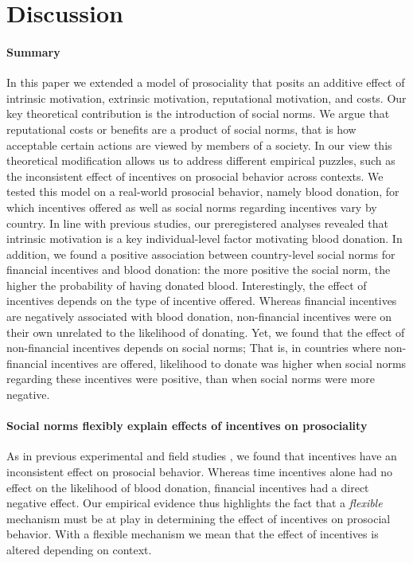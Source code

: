 \documentclass[AER]{AEA}
\begin{document}
\section{Discussion}

\paragraph{Summary}

In this paper we extended a model of prosociality that posits an additive effect of intrinsic motivation, extrinsic motivation, reputational motivation, and costs. Our key theoretical contribution is the introduction of social norms. We argue that reputational costs or benefits are a product of social norms, that is how acceptable certain actions are viewed by members of a society. In our view this theoretical modification allows us to address different empirical puzzles, such as the inconsistent effect of incentives on prosocial behavior across contexts. We tested this model on a real-world prosocial behavior, namely blood donation, for which incentives offered as well as social norms regarding incentives vary by country. In line with previous studies, our preregistered analyses revealed that intrinsic motivation is a key individual-level factor motivating blood donation. In addition, we found a positive association between country-level social norms for financial incentives and blood donation: the more positive the social norm, the higher the probability of having donated blood. Interestingly, the effect of incentives depends on the type of incentive offered. Whereas financial incentives are negatively associated with blood donation, non-financial incentives were on their own unrelated to the likelihood of donating. Yet, we found that the effect of non-financial incentives depends on social norms; That is, in countries where non-financial incentives are offered, likelihood to donate was higher when social norms regarding these incentives were positive, than when social norms were more negative. 

\paragraph{Social norms flexibly explain effects of incentives on prosociality}

As in previous experimental and field studies \cite[see ][]{gneezy_when_2011, chell_systematic_2018}, we found that incentives have an inconsistent effect on prosocial behavior. Whereas time incentives alone had no effect on the likelihood of blood donation, financial incentives had a direct negative effect. Our empirical evidence thus highlights the fact that a \textit{flexible} mechanism must be at play in determining the effect of incentives on prosocial behavior. With a flexible mechanism we mean that the effect of incentives is altered depending on context.
\end{document}

